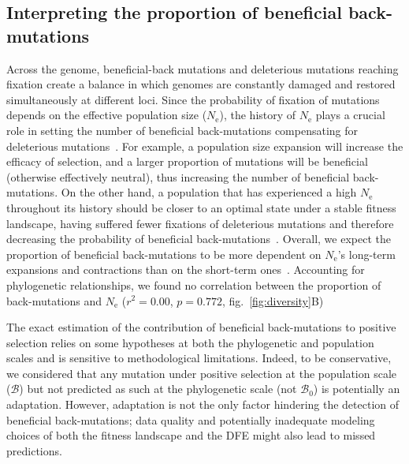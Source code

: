 \documentclass{article}
\newcommand{\Ne}{N_{\text{e}}}
\newcommand{\SphyBen}{\mathcal{B}_0}
\newcommand{\SpopBen}{\mathcal{B}}
\begin{document}
    \subsection*{Interpreting the proportion of beneficial back-mutations}

    Across the genome, beneficial-back mutations and deleterious mutations reaching fixation create a balance in which genomes are constantly damaged and restored simultaneously at different loci.
    Since the probability of fixation of mutations depends on the effective population size ($\Ne$), the history of $\Ne$ plays a crucial role in setting the number of beneficial back-mutations compensating for deleterious mutations~\cite{latrille_inferring_2021}.
    For example, a population size expansion will increase the efficacy of selection, and a larger proportion of mutations will be beneficial (otherwise effectively neutral), thus increasing the number of beneficial back-mutations.
    On the other hand, a population that has experienced a high $\Ne$ throughout its history should be closer to an optimal state under a stable fitness landscape, having suffered fewer fixations of deleterious mutations and therefore decreasing the probability of beneficial back-mutations~\cite{huber_determining_2017}.
    Overall, we expect the proportion of beneficial back-mutations to be more dependent on $\Ne$’s long-term expansions and contractions than on the short-term ones~\cite{charlesworth_other_2007,huber_determining_2017}.
    Accounting for phylogenetic relationships, we found no correlation between the proportion of back-mutations and $\Ne$ ($r^2=0.00$, $p=0.772$, fig.~\ref{fig:diversity}B)

    The exact estimation of the contribution of beneficial back-mutations to positive selection relies on some hypotheses at both the phylogenetic and population scales and is sensitive to methodological limitations.
    Indeed, to be conservative, we considered that any mutation under positive selection at the population scale ($\SpopBen$) but not predicted as such at the phylogenetic scale (not $\SphyBen$) is potentially an adaptation.
    However, adaptation is not the only factor hindering the detection of beneficial back-mutations; data quality and potentially inadequate modeling choices of both the fitness landscape and the DFE might also lead to missed predictions.
\end{document}
